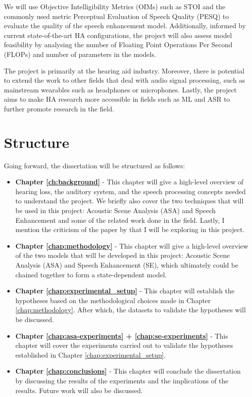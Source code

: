 \documentclass[logo,bsc,singlespacing,parskip,online]{infthesis}
\begin{document}
We will use Objective Intelligibility Metrics (OIMs) such as STOI 
and the commonly used metric Perceptual Evaluation of Speech Quality (PESQ)  
to evaluate the quality of the speech enhancement model.
Additionally, informed by current state-of-the-art HA configurations, the project will also assess model feasibility by analysing the number of Floating Point Operations Per Second (FLOPs) and number of parameters
in the models.

The project is primarily at the hearing aid industry. 
Moreover, there is potential to extend the work to other fields that deal with audio signal processing,
such as mainstream wearables such as headphones or microphones. Lastly, the project aims to make HA research more accessible 
in fields such as ML and ASR to further promote research in the field.


\section{Structure}
Going forward, the dissertation will be structured as follows:
\begin{itemize}  
   \item \textbf{Chapter \ref{ch:background}} - This chapter will give a high-level overview of hearing loss, the auditory system, and the speech processing concepts needed to understand the project.
   We briefly also cover the two techniques that will be used in this project: Acoustic Scene Analysis (ASA) and Speech Enhancement
   and some of the related work done in the field. Lastly, I mention the criticism of the paper by \citet{Huwel2020HearDS} 
   that I will be exploring in this project.
   \item \textbf{Chapter \ref{chap:methodology}} - This chapter will give a high-level overview of the two models that will be developed in this project: Acoustic Scene Analysis (ASA) and Speech Enhancement (SE),
   which ultimately could be chained together to form a state-dependent model.
   \item \textbf{Chapter \ref{chap:experimental_setup}} - This chapter will establish the hypotheses based on the methodological choices made in Chapter \ref{chap:methodology}. After which, the datasets to 
   validate the hypotheses will be discussed.
   \item \textbf{Chapter \ref{chap:asa-experiments} + \ref{chap:se-experiments}} - This chapter will cover the experiments carried out to validate the hypotheses established in Chapter \ref{chap:experimental_setup}.
   \item \textbf{Chapter \ref{chap:conclusions}} - This chapter will conclude the dissertation by discussing the results of the experiments and the implications of the results. Future work will also be discussed.
\end{itemize}
 
\end{document}

